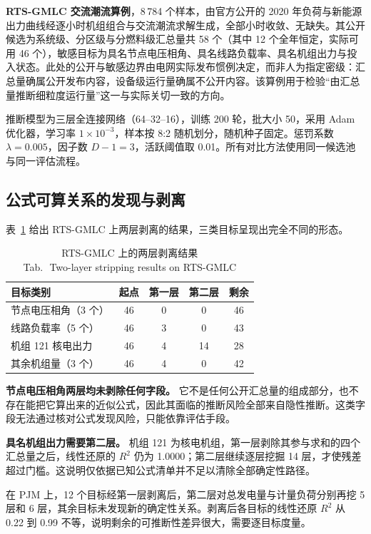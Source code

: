 \documentclass[UTF8,zihao=5,twoside]{ctexart}
\newcommand{\tabbicaption}[2]{\caption{#1\\[-0.2em]\small Tab.\,\thetable\ #2}}
\begin{document}
\textbf{RTS-GMLC 交流潮流算例}，8\,784 个样本，由官方公开的 2020 年负荷与新能源出力曲线经逐小时机组组合与交流潮流求解生成，全部小时收敛、无缺失。其公开候选为系统级、分区级与分燃料级汇总量共 58 个（其中 12 个全年恒定，实际可用 46 个），敏感目标为具名节点电压相角、具名线路负载率、具名机组出力与投入状态。此处的公开与敏感边界由电网实际发布惯例决定，而非人为指定密级：汇总量确属公开发布内容，设备级运行量确属不公开内容。该算例用于检验“由汇总量推断细粒度运行量”这一与实际关切一致的方向。

推断模型为三层全连接网络（64--32--16），训练 200 轮，批大小 50，采用 Adam 优化器\cite{ref-kingma-adam}，学习率 $1\times10^{-3}$，样本按 8:2 随机划分，随机种子固定。惩罚系数 $\lambda=0.005$，因子数 $D-1=3$，活跃阈值取 0.01。所有对比方法使用同一候选池与同一评估流程。

\subsection{公式可算关系的发现与剥离}

表~\ref{tab:strip} 给出 RTS-GMLC 上两层剥离的结果，三类目标呈现出完全不同的形态。

\begin{table}[!tbp]
\centering
\tabbicaption{RTS-GMLC 上的两层剥离结果}{Two-layer stripping results on RTS-GMLC}
\label{tab:strip}
\setlength{\tabcolsep}{3.5pt}
\begin{tabular}{lcccc}
\toprule
目标类别 & 起点 & 第一层 & 第二层 & 剩余 \\
\midrule
节点电压相角（3 个） & 46 & 0 & 0 & 46 \\
线路负载率（5 个） & 46 & 3 & 0 & 43 \\
机组 121 核电出力 & 46 & 4 & 14 & 28 \\
其余机组量（3 个） & 46 & 4 & 0 & 42 \\
\bottomrule
\end{tabular}
\end{table}

\textbf{节点电压相角两层均未剥除任何字段。} 它不是任何公开汇总量的组成部分，也不存在能把它算出来的近似公式，因此其面临的推断风险全部来自隐性推断。这类字段无法通过核对公式发现风险，只能依靠评估手段。

\textbf{具名机组出力需要第二层。} 机组 121 为核电机组，第一层剥除其参与求和的四个汇总量之后，线性还原的 $R^2$ 仍为 1.0000；第二层继续逐层挖掘 14 层，才使残差超过门槛。这说明仅依据已知公式清单并不足以清除全部确定性路径。

在 PJM 上，12 个目标经第一层剥离后，第二层对总发电量与计量负荷分别再挖 5 层和 6 层，其余目标未发现新的确定性关系。剥离后各目标的线性还原 $R^2$ 从 0.22 到 0.99 不等，说明剩余的可推断性差异很大，需要逐目标度量。
\end{document}
